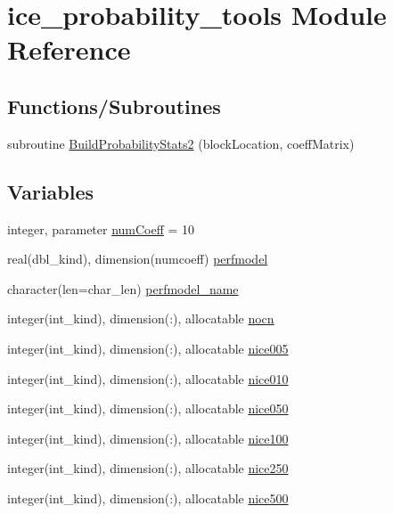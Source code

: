 \hypertarget{namespaceice__probability__tools}{
\section{ice\_\-probability\_\-tools Module Reference}
\label{namespaceice__probability__tools}
}
\subsection*{Functions/Subroutines}
\begin{DoxyCompactItemize}
\item 
subroutine \hyperlink{namespaceice__probability__tools_a606ed01210f43ca631f18ef6aeb76170}{BuildProbabilityStats2} (blockLocation, coeffMatrix)
\end{DoxyCompactItemize}
\subsection*{Variables}
\begin{DoxyCompactItemize}
\item 
integer, parameter \hyperlink{namespaceice__probability__tools_a19cc6dcab9584f8783ab3cece86c3966}{numCoeff} = 10
\item 
real(dbl\_\-kind), dimension(numcoeff) \hyperlink{namespaceice__probability__tools_af927f37aef7bc03ca64ba094ea588760}{perfmodel}
\item 
character(len=char\_\-len) \hyperlink{namespaceice__probability__tools_a5907d2a055440e7db18603f97f34d6d3}{perfmodel\_\-name}
\item 
integer(int\_\-kind), dimension(:), allocatable \hyperlink{namespaceice__probability__tools_aff66cd322edf027b1f82d23dca0e277e}{nocn}
\item 
integer(int\_\-kind), dimension(:), allocatable \hyperlink{namespaceice__probability__tools_a9061fb8c3f06ed148c2a394fc1af7536}{nice005}
\item 
integer(int\_\-kind), dimension(:), allocatable \hyperlink{namespaceice__probability__tools_a721bb86743f1f3f3b051779bbddcd27e}{nice010}
\item 
integer(int\_\-kind), dimension(:), allocatable \hyperlink{namespaceice__probability__tools_a9263f16b9cec2512c8b0c9d1b07fbd2d}{nice050}
\item 
integer(int\_\-kind), dimension(:), allocatable \hyperlink{namespaceice__probability__tools_aea9a275f5ab127afd6106f0377adb741}{nice100}
\item 
integer(int\_\-kind), dimension(:), allocatable \hyperlink{namespaceice__probability__tools_a28e6a34d3f9ec9f1edc6985ba263b41a}{nice250}
\item 
integer(int\_\-kind), dimension(:), allocatable \hyperlink{namespaceice__probability__tools_ad3ea4a7f9fd8145949defb7e6ece246d}{nice500}
\end{DoxyCompactItemize}


